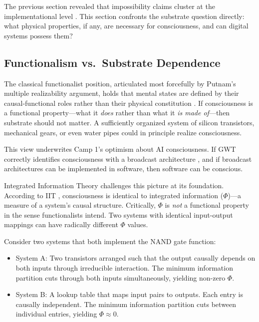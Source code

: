
The previous section revealed that impossibility claims cluster at the implementational
level \cite{campero2025taxonomy}. This section confronts the substrate question directly:
what physical properties, if any, are necessary for consciousness, and can digital systems
possess them?

\subsection{Functionalism vs.\ Substrate Dependence}

The classical functionalist position, articulated most forcefully by Putnam's multiple
realizability argument, holds that mental states are defined by their causal-functional
roles rather than their physical constitution \cite{chalmers2023could}. If consciousness is
a functional property---what it \emph{does} rather than what it \emph{is made of}---then
substrate should not matter. A sufficiently organized system of silicon transistors,
mechanical gears, or even water pipes could in principle realize consciousness.

This view underwrites Camp 1's optimism about AI consciousness. If GWT correctly identifies
consciousness with a broadcast architecture \cite{baars1988cognitive, dehaene2014toward},
and if broadcast architectures can be implemented in software, then software can be conscious.

Integrated Information Theory challenges this picture at its foundation. According to IIT
\cite{tononi2004information, tononi2016integrated, albantakis2023iit4}, consciousness is
identical to integrated information ($\Phi$)---a measure of a system's causal structure.
Critically, $\Phi$ is \emph{not} a functional property in the sense functionalists intend.
Two systems with identical input-output mappings can have radically different $\Phi$ values.

Consider two systems that both implement the NAND gate function:

\begin{itemize}[leftmargin=2em]
\item System A: Two transistors arranged such that the output causally depends on both
      inputs through irreducible interaction. The minimum information partition cuts through
      both inputs simultaneously, yielding non-zero $\Phi$.
\item System B: A lookup table that maps input pairs to outputs. Each entry is causally
      independent. The minimum information partition cuts between individual entries,
      yielding $\Phi \approx 0$.
\end{itemize}

